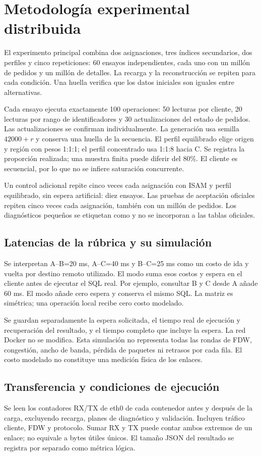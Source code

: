 \documentclass[11pt,a4paper]{article}
\newcommand{\code}[1]{\texttt{\detokenize{#1}}}
\begin{document}
\section{Metodología experimental distribuida}
El experimento principal combina dos asignaciones, tres índices secundarios,
dos perfiles y cinco repeticiones: 60 ensayos independientes, cada uno con un
millón de pedidos y un millón de detalles. La recarga y la reconstrucción se
repiten para cada condición. Una huella verifica que los datos iniciales son
iguales entre alternativas.

Cada ensayo ejecuta exactamente 100 operaciones: 50 lecturas por cliente,
20 lecturas por rango de identificadores y 30 actualizaciones del estado de
pedidos. Las actualizaciones se confirman individualmente. La generación usa
semilla $42000+r$ y conserva una huella de la secuencia. El perfil equilibrado
elige origen y región con pesos 1:1:1; el perfil concentrado usa 1:1:8 hacia C.
Se registra la proporción realizada; una muestra finita puede diferir del 80\%.
El cliente es secuencial, por lo que no se infiere saturación concurrente.

Un control adicional repite cinco veces cada asignación con ISAM y perfil
equilibrado, sin espera artificial: diez ensayos. Las pruebas de aceptación
oficiales repiten cinco veces cada asignación, también con un millón de pedidos.
Los diagnósticos pequeños se etiquetan como \code{smoke} y no se incorporan a
las tablas oficiales.

\subsection{Latencias de la rúbrica y su simulación}
Se interpretan A--B=20 ms, A--C=40 ms y B--C=25 ms como un costo de ida y vuelta
por destino remoto utilizado. El modo \code{model} suma esos costos y espera en
el cliente antes de ejecutar el SQL real. Por ejemplo, consultar B y C desde A
añade 60 ms. El modo \code{base} añade cero espera y conserva el mismo SQL.
La matriz es simétrica; una operación local recibe cero costo modelado.

Se guardan separadamente la espera solicitada, el tiempo real de ejecución y
recuperación del resultado, y el tiempo completo que incluye la espera.
La red Docker no se modifica. Esta simulación no representa todas las rondas de
FDW, congestión, ancho de banda, pérdida de paquetes ni retrasos por cada fila.
El costo modelado no constituye una medición física de los enlaces.

\subsection{Transferencia y condiciones de ejecución}
Se leen los contadores RX/TX de eth0 de cada contenedor antes y después de la
carga, excluyendo recarga, planes de diagnóstico y validación. Incluyen tráfico
cliente, FDW y protocolo. Sumar RX y TX puede contar ambos extremos de un enlace;
no equivale a bytes útiles únicos. El tamaño JSON del resultado se registra por
separado como métrica lógica.
\end{document}
